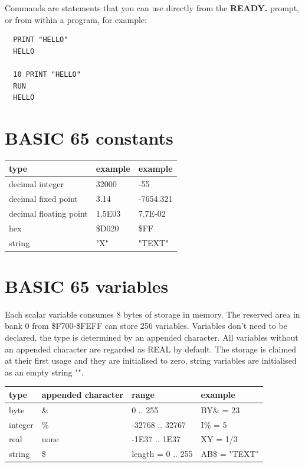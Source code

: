 Commands are statements that you can use directly from the {\bf READY.}
prompt, or from within a program, for example:

\begin{tcolorbox}[colback=black,coltext=white]
\verbatimfont{\codefont}
\begin{verbatim}
  PRINT "HELLO"
  HELLO

  10 PRINT "HELLO"
  RUN
  HELLO
\end{verbatim}
\end{tcolorbox}

\newpage
\section{BASIC 65 constants}

{\ttfamily
\setlength{\tabcolsep}{1mm}
\begin{center}
\begin{tabular}{|l|l|l|}
\hline
 type                   & example & example \\
\hline
decimal integer         &  32000  & -55       \\
decimal fixed point     &  3.14   & -7654.321 \\
decimal floating point  &  1.5E03 & 7.7E-02   \\
hex                     &  \$D020 & \$FF      \\
string                  & "X"     & "TEXT"    \\
\hline
\end{tabular}
\end{center}
}

\section{BASIC 65 variables}

Each scalar variable consumes 8 bytes of storage in memory.
The reserved area in bank 0 from \$F700-\$FEFF can store 256 variables.
Variables don't need to be declared, the type is determined by an appended
character. All variables without an appended character are regarded as REAL by default.
The storage is claimed at their first usage and they are initialised to zero,
string variables are initialised as an empty string "".

{\ttfamily
\setlength{\tabcolsep}{1mm}
\begin{center}
\begin{tabular}{|l|l|l|l|}
\hline
 type                   & appended character & range    & example  \\
\hline
byte                    &    \&    & 0 .. 255        & BY\& = 23 \\
integer                 &    \%    & -32768 .. 32767 & I\% = 5    \\
real                    &   none   & -1E37 .. 1E37   & XY = 1/3   \\
string                  &    \$    & length = 0 .. 255 & AB\$ = "TEXT" \\
\hline
\end{tabular}
\end{center}
}

